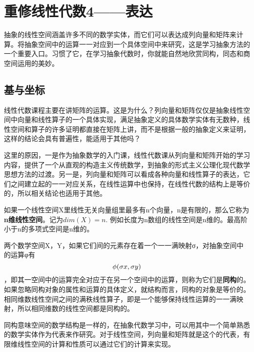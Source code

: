 \section{重修线性代数4——表达} 
抽象的线性空间涵盖许多不同的数学实体，而它们可以表达成列向量和矩阵来计算。将抽象空间中的运算一一对应到一个具体空间中来研究，这是学习抽象方法的一个重要入口。习惯了它，在学习抽象代数时，你就能自然地欣赏同构，同态和商空间运用的美妙。

\subsection{基与坐标}

线性代数课程主要在讲矩阵的运算。这是为什么？列向量和矩阵仅仅是抽象线性空间中向量和线性算子的一个具体实现，满足抽象定义的具体数学实体有无数种，线性空间和算子的许多证明都直接在矩阵上讲，而不是根据一般的抽象定义来证明，这样的结论会具有普遍性，能适用于其他吗？

这里的原因，一是作为抽象数学的入门课，线性代数课从列向量和矩阵开始的学习内容，提供了一个从直观的构造主义传统数学，到抽象的形式主义公理化现代数学思想方法的过渡。另一是，列向量和矩阵可以看成各种向量和线性算子的表达，它们之间建立起的一一对应关系，在线性运算中也保持，在线性代数的结构上是等价的，所以相关结论也适用于其他。

如果一个线性空间X里线性无关向量组里最多有n个向量，n是有限的，那么它称为\textbf{n维线性空间}。记为$ dim(X)=n $.  例如长度为n数组的线性空间是n维的。最高阶小于n的多项式空间是n维的。

两个数学空间X，Y，如果它们间的元素存在着一个一一满映射σ，对抽象空间中的运算φ有 %
\[{\rm{ }}\phi (\sigma x,\sigma y)\] ，即其一空间中的运算完全对应于在另一个空间中的运算，则称为它们是\textbf{同构}的。如果忽略同构对象的属性和运算的具体定义，就结构而言，同构的对象是等价的。相同维数线性空间之间的满秩线性算子，即是一个能够保持线性运算的一一满映射，所以相同维数的线性空间都是同构的。

同构意味空间的数学结构是一样的，在抽象代数学习中，可以用其中一个简单熟悉的数学实体作为代表来作研究。对于线性空间，列向量和矩阵就是这个的代表，有限维线性空间的计算和性质可以通过它们的计算来实现。

